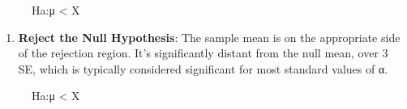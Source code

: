 \documentclass[
  letterpaper,
  DIV=11,
  numbers=noendperiod]{scrreprt}
\providecommand{\tightlist}{%
  \setlength{\itemsep}{0pt}\setlength{\parskip}{0pt}}\usepackage{longtable,booktabs,array}
\begin{document}
\begin{figure}


\caption{\label{fig-5-5.fail_to_reject_2}Ha:μ \textless{} X}

\end{figure}%

\begin{enumerate}
\def\labelenumi{\arabic{enumi}.}
\setcounter{enumi}{2}
\tightlist
\item
  \textbf{Reject the Null Hypothesis}: The sample mean is on the
  appropriate side of the rejection region. It's significantly distant
  from the null mean, over 3 SE, which is typically considered
  significant for most standard values of α.
\end{enumerate}

\begin{figure}


\caption{\label{fig-5-5.reject_1}Ha:μ \textless{} X}

\end{figure}%
\end{document}
